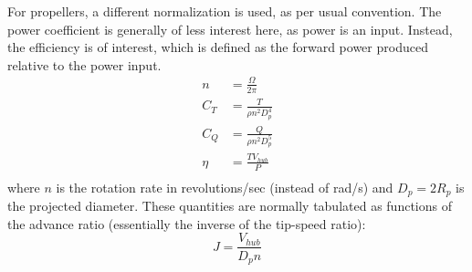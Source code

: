\documentclass{article}
\begin{document}
For propellers, a different normalization is used, as per usual convention.  The power coefficient is generally of less interest here, as power is an input.  Instead, the efficiency is of interest, which is defined as the forward power produced relative to the power input.
\begin{equation}
\begin{aligned}
n &= \frac{\Omega}{2 \pi} \\
C_T &= \frac{T}{\rho n^2 D_p^4}\\
C_Q &= \frac{Q}{\rho n^2 D_p^5}\\
\eta &= \frac{T V_{hub}}{P} \\
\end{aligned}
\end{equation}
where $n$ is the rotation rate in revolutions/sec (instead of rad/s) and $D_p = 2 R_p$ is the projected diameter.  These quantities are normally tabulated as functions of the advance ratio (essentially the inverse of the tip-speed ratio):
\begin{equation}
    J = \frac{V_{hub}}{D_p n}
\end{equation}




\end{document}
